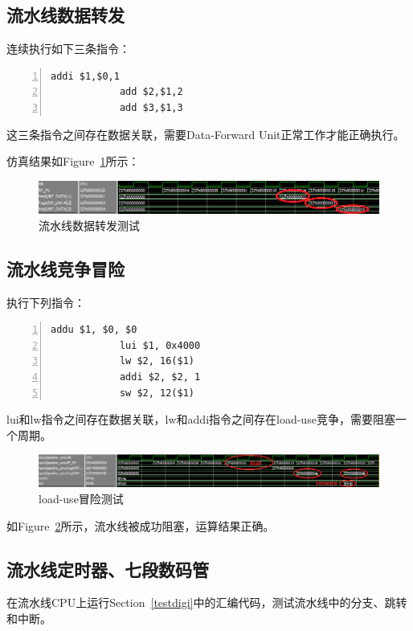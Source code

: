 \documentclass{article}
\begin{document}
        \subsection{流水线数据转发}
            连续执行如下三条指令：
            \begin{Verbatim}[frame=lines,numbers=left,stepnumber=5,label={test\_dataforward.asm}]
            addi $1,$0,1
            add $2,$1,2
            add $3,$1,3
            \end{Verbatim}
            这三条指令之间存在数据关联，需要Data-Forward Unit正常工作才能正确执行。

            仿真结果如Figure~\ref{fig:pipeline_dataforwardtest}所示：
            \begin{figure}[H]
                \centering
                \includegraphics[width=\textwidth]{images/pipeline_dataforwardtest.png}
                \caption{\label{fig:pipeline_dataforwardtest}流水线数据转发测试}
            \end{figure}

        \subsection{流水线竞争冒险}
            执行下列指令：
            \begin{Verbatim}[frame=lines,numbers=left,stepnumber=5,label={test\_loaduse.asm}]
            addu $1, $0, $0
            lui $1, 0x4000
            lw $2, 16($1)
            addi $2, $2, 1
            sw $2, 12($1)
            \end{Verbatim}
            lui和lw指令之间存在数据关联，lw和addi指令之间存在load-use竞争，需要阻塞一个周期。
            \begin{figure}[H]
                \centering
                \includegraphics[width=\textwidth]{images/pipeline_loadusetest.png}
                \caption{\label{fig:pipeline_loadusetest}load-use冒险测试}
            \end{figure}
            如Figure~\ref{fig:pipeline_loadusetest}所示，流水线被成功阻塞，运算结果正确。

        \subsection{流水线定时器、七段数码管}
            在流水线CPU上运行Section~\ref{testdigi}中的汇编代码，测试流水线中的分支、跳转和中断。
\end{document}
